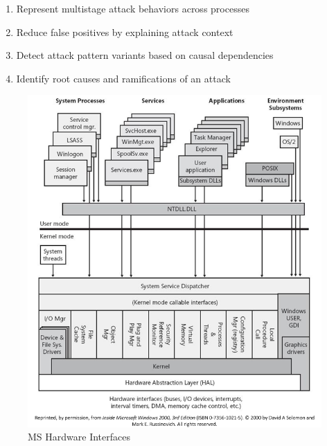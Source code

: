 \documentclass{article}
\begin{document}
\begin{enumerate}
\item Represent multistage attack behaviors across processes
\item Reduce false positives by explaining attack context
\item Detect attack pattern variants based on causal dependencies
\item Identify root causes and ramifications of an attack
\end{enumerate}



\begin{figure}[ht]
\includegraphics[scale=0.4]{ms_hardware_interfaces.png}
\caption{MS Hardware Interfaces}
\end{figure}

\printbibliography
\end{document}
